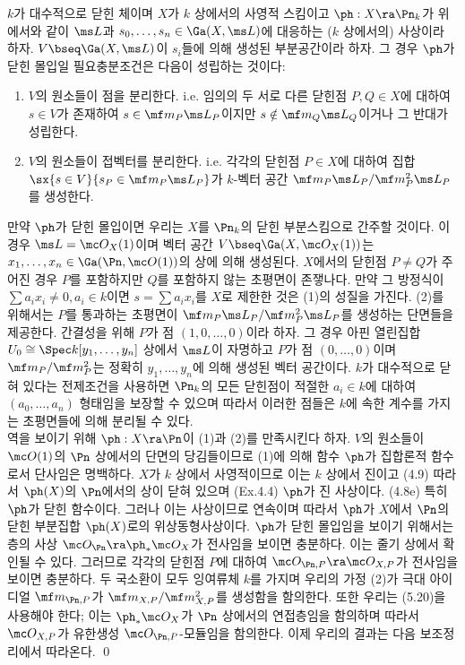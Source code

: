 	
	\begin{proposition}
	$k$가 대수적으로 닫힌 체이며 $X$가 $k$ 상에서의 사영적 스킴이고 $\ph:X\ra\Pn_k$가 위에서와 같이 $\ms L$과
	$s_0,\ldots,s_n\in\Ga(X,\ms L)$에 대응하는 ($k$ 상에서의) 사상이라 하자.
	$V\bseq\Ga(X,\ms L)$이 $s_i$들에 의해 생성된 부분공간이라 하자. 그 경우 $\ph$가 닫힌 몰입일 필요충분조건은 다음이 성립하는 것이다:
	\begin{enumerate}[label=(\arabic*)]
	\item $V$의 원소들이 점을 분리한다. i.e. 임의의 두 서로 다른 닫힌점 $P,Q\in X$에 대하여
	$s\in V$가 존재하여 $s\in\mf m_P\ms L_P$이지만 $s\notin\mf m_Q\ms L_Q$이거나 그 반대가 성립한다.
	\item $V$의 원소들이 접벡터를 분리한다. i.e. 각각의 닫힌점 $P\in X$에 대하여 집합 $\sx{s\in V}{s_P\in\mf m_P\ms L_P}$가
	$k$-벡터 공간 $\mf m_P\ms L_P/\mf m_P^2\ms L_P$를 생성한다.\\
	\end{enumerate}
	\pf 만약 $\ph$가 닫힌 몰입이면 우리는 $X$를 $\Pn_k$의 닫힌 부분스킴으로 간주할 것이다.
	이 경우 $\ms L=\mc O_X(1)$이며 벡터 공간 $V\bseq\Ga(X,\mc O_X(1))$는 $x_1,\ldots,x_n\in\Ga(\Pn,\mc O(1))$의 상에 의해 생성된다.
	$X$에서의 닫힌점 $P\ne Q$가 주어진 경우 $P$를 포함하지만 $Q$를 포함하지 않는 초평면이 존쟇나다.
	만약 그 방정식이 $\sum a_ix_i\ne 0,a_i\in k$이면 $s=\sum a_ix_i$를 $X$로 제한한 것은 (1)의 성질을 가진다.
	(2)를 위해서는 $P$를 통과하는 초평면이 $\mf m_P\ms L_P/\mf m_P^2\ms L_P$를 생성하는 단면들을 제공한다.
	간결성을 위해 $P$가 점 $(1,0,\ldots,0)$이라 하자. 그 경우 아핀 열린집합 $U_0\cong\Spec k[y_1,\ldots,y_n]$ 상에서
	$\ms L$이 자명하고 $P$가 점 $(0,\ldots,0)$이며 $\mf m_P/\mf m_P^2$는 정확히 $y_1,\ldots,y_n$에 의해 생성된 벡터 공간이다.
	$k$가 대수적으로 닫혀 있다는 전제조건을 사용하면 $\Pn_k$의 모든 닫힌점이 적절한 $a_i\in k$에 대하여
	$(a_0,\ldots,a_n)$ 형태임을 보장할 수 있으며 따라서 이러한 점들은 $k$에 속한 계수를 가지는 초평면들에 의해 분리될 수 있다.\\
	역을 보이기 위해 $\ph:X\ra\Pn$이 (1)과 (2)를 만족시킨다 하자.
	$V$의 원소들이 $\mc O(1)$의 $\Pn$ 상에서의 단면의 당김들이므로 (1)에 의해 함수 $\ph$가 집합론적 함수로서 단사임은 명백하다.
	$X$가 $k$ 상에서 사영적이므로 이는 $k$ 상에서 진이고 (4.9) 따라서 $\ph(X)$의 $\Pn$에서의 상이 닫혀 있으며 (Ex.4.4)
	$\ph$가 진 사상이다. (4.8e) 특히 $\ph$가 닫힌 함수이다.
	그러나 이는 사상이므로 연속이며 따라서 $\ph$가 $X$에서 $\Pn$의 닫힌 부분집합 $\ph(X)$로의 위상동형사상이다.
	$\ph$가 닫힌 몰입임을 보이기 위해서는 층의 사상 $\mc O_{\Pn}\ra\ph_*\mc O_X$가 전사임을 보이면 충분하다.
	이는 줄기 상에서 확인될 수 있다. 그러므로 각각의 닫힌점 $P$에 대하여 $\mc O_{\Pn,P}\ra\mc O_{X,P}$가 전사임을 보이면 충분하다.
	두 국소환이 모두 잉여류체 $k$를 가지며 우리의 가정 (2)가 극대 아이디얼
	$\mf m_{\Pn,P}$가 $\mf m_{X,P}/\mf m_{X,P}^2$를 생성함을 함의한다.
	또한 우리는 (5.20)을 사용해야 한다; 이는 $\ph_*\mc O_X$가 $\Pn$ 상에서의 연접층임을 함의하며
	따라서 $\mc O_{X,P}$가 유한생성 $\mc O_{\Pn,P}$-모듈임을 함의한다.
	이제 우리의 결과는 다음 보조정리에서 따라온다.
	\qed
	\end{proposition}
	
